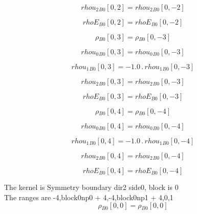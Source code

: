 \documentclass{article}
\begin{document}
\begin{dmath}{rhou_{2}{_{B0}}}[{0,2}] = {rhou_{2}{_{B0}}}[{0,-2}]\end{dmath}

\begin{dmath}{rhoE{_{B0}}}[{0,2}] = {rhoE{_{B0}}}[{0,-2}]\end{dmath}

\begin{dmath}{\rho{_{B0}}}[{0,3}] = {\rho{_{B0}}}[{0,-3}]\end{dmath}

\begin{dmath}{rhou_{0}{_{B0}}}[{0,3}] = {rhou_{0}{_{B0}}}[{0,-3}]\end{dmath}

\begin{dmath}{rhou_{1}{_{B0}}}[{0,3}] = - 1.0 \,.\, {rhou_{1}{_{B0}}}[{0,-3}]\end{dmath}

\begin{dmath}{rhou_{2}{_{B0}}}[{0,3}] = {rhou_{2}{_{B0}}}[{0,-3}]\end{dmath}

\begin{dmath}{rhoE{_{B0}}}[{0,3}] = {rhoE{_{B0}}}[{0,-3}]\end{dmath}

\begin{dmath}{\rho{_{B0}}}[{0,4}] = {\rho{_{B0}}}[{0,-4}]\end{dmath}

\begin{dmath}{rhou_{0}{_{B0}}}[{0,4}] = {rhou_{0}{_{B0}}}[{0,-4}]\end{dmath}

\begin{dmath}{rhou_{1}{_{B0}}}[{0,4}] = - 1.0 \,.\, {rhou_{1}{_{B0}}}[{0,-4}]\end{dmath}

\begin{dmath}{rhou_{2}{_{B0}}}[{0,4}] = {rhou_{2}{_{B0}}}[{0,-4}]\end{dmath}

\begin{dmath}{rhoE{_{B0}}}[{0,4}] = {rhoE{_{B0}}}[{0,-4}]\end{dmath}

\noindent The kernel is Symmetry boundary dir2 side0, block is 0\\\noindent The ranges are -4,block0np0 + 4,-4,block0np1 + 4,0,1\\\begin{dmath}{\rho{_{B0}}}[{0,0}] = {\rho{_{B0}}}[{0,0}]\end{dmath}
\end{document}
